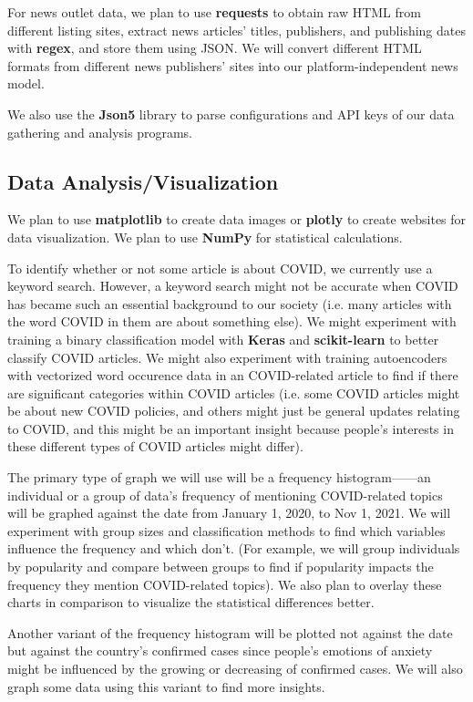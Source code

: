\documentclass[fontsize=11pt]{article}
\begin{document}
    For news outlet data, we plan to use \textbf{requests} to obtain raw HTML from different listing sites, extract news articles’ titles, publishers, and publishing dates with \textbf{regex}, and store them using JSON. We will convert different HTML formats from different news publishers’ sites into our platform-independent news model.

    We also use the \textbf{Json5} library to parse configurations and API keys of our data gathering and analysis programs.

    \subsection*{Data Analysis/Visualization}

    \indent

    We plan to use \textbf{matplotlib} to create data images or \textbf{plotly} to create websites for data visualization. We plan to use \textbf{NumPy} for statistical calculations.

    To identify whether or not some article is about COVID, we currently use a keyword search. However, a keyword search might not be accurate when COVID has became such an essential background to our society (i.e. many articles with the word COVID in them are about something else). We might experiment with training a binary classification model with \textbf{Keras} and \textbf{scikit-learn} to better classify COVID articles. We might also experiment with training autoencoders with vectorized word occurence data in an COVID-related article to find if there are significant categories within COVID articles (i.e. some COVID articles might be about new COVID policies, and others might just be general updates relating to COVID, and this might be an important insight because people's interests in these different types of COVID articles might differ).

    The primary type of graph we will use will be a frequency histogram——an individual or a group of data’s frequency of mentioning COVID-related topics will be graphed against the date from January 1, 2020, to Nov 1, 2021. We will experiment with group sizes and classification methods to find which variables influence the frequency and which don’t. (For example, we will group individuals by popularity and compare between groups to find if popularity impacts the frequency they mention COVID-related topics). We also plan to overlay these charts in comparison to visualize the statistical differences better.

    Another variant of the frequency histogram will be plotted not against the date but against the country’s confirmed cases since people’s emotions of anxiety might be influenced by the growing or decreasing of confirmed cases. We will also graph some data using this variant to find more insights.


    \nocite{*}
    \printbibliography
\end{document}
